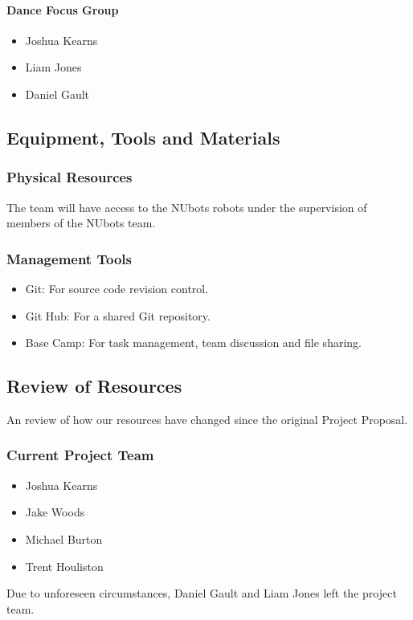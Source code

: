 \documentclass[a4paper]{article}
\begin{document}
				\paragraph{Dance Focus Group}
					\begin{itemize}
						\item Joshua Kearns
						\item Liam Jones
						\item Daniel Gault
					\end{itemize}
		\subsection{Equipment, Tools and Materials}
			\subsubsection{Physical Resources}
			The team will have access to the NUbots robots under the supervision of members of the NUbots team.
			\subsubsection{Management Tools}
				\begin{itemize}
					\item Git: For source code revision control.
					\item Git Hub: For a shared Git repository.
					\item Base Camp: For task management, team discussion and file sharing.
				\end{itemize}
		\subsection {Review of Resources}
			An review of how our resources have changed since the original Project Proposal.
			\subsubsection{Current Project Team}
				\begin{itemize}
					\item Joshua Kearns
					\item Jake Woods
					\item Michael Burton
					\item Trent Houliston
				\end{itemize}
				Due to unforeseen circumstances, Daniel Gault and Liam Jones left the project team.
\end{document}
